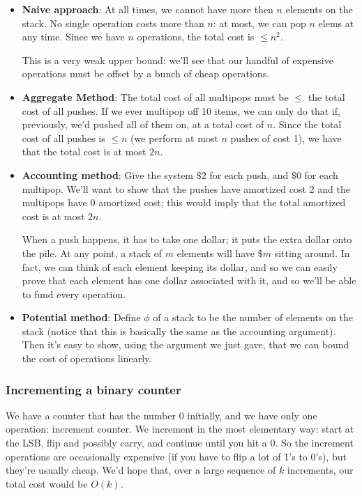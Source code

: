 \documentclass{article}
\begin{document}
\begin{itemize}
	\item 
	\textbf{Naive approach}:
	At all times, we cannot have more then $n$ elements on the stack.
	No single operation costs more than $n$: at most, we can pop $n$
	elems at any time.
	Since we have $n$ operations, the total cost is $\leq n^2$.
	
	This is a very weak upper bound: we'll see that our handful of
	expensive operations must be offset by a bunch of cheap 
	operations.
	
	\item
	\textbf{Aggregate Method}:
	The total cost of all multipops must be $\leq$ the total cost of all 
	pushes.
	If we ever multipop off 10 items, we can only do that if, previously,
	we'd pushed all of them on, at a total cost of $n$.
	Since the total cost of all pushes is $\leq n$ (we perform at most
	$n$ pushes of cost 1), we have that the total cost is at most $2n$.
	
	\item
	\textbf{Accounting method}:
	Give the system $\$2$ for each push, and $\$0$ for each multipop.
	We'll want to show that the pushes have amortized cost 2 and the
	multipops have 0 amortized cost; this would imply that the total
	amortized cost is at most $2n$.
	
	When a push happens, it has to take one dollar; it puts the
	extra dollar onto the pile.
	At any point, a stack of $m$ elements will have $\$m$ sitting around.
	In fact, we can think of each element keeping its dollar, and so
	we can easily prove that each element has one dollar associated with
	it, and so we'll be able to fund every operation.
	
	\item
	\textbf{Potential method}:
	Define $\phi$ of a stack to be the number of elements on the stack
	(notice that this is basically the same as the accounting argument).
	Then it's easy to show, using the argument we just gave, that
	we can bound the cost of operations linearly.
	

\end{itemize}




\subsubsection{Incrementing a binary counter}

We have a counter that has the number $0$ initially, and we have only
one operation: increment counter.
We increment in the most elementary way: start at the LSB, flip and
possibly carry, and continue until you hit a 0.
So the increment operations are occasionally expensive (if you have to
flip a lot of 1's to 0's), but they're usually cheap.
We'd hope that, over a large sequence of $k$ increments, our total cost
would be $O(k)$.
\end{document}
